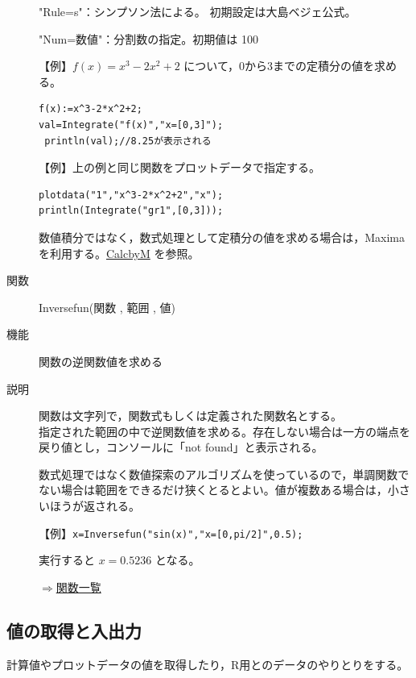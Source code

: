 \documentclass[papersize,a4paper,12pt,uplatex]{jsarticle}
\begin{document}
\begin{description}
"Rule=s"：シンプソン法による。 初期設定は大島ベジェ公式。

"Num=数値"：分割数の指定。初期値は 100 

\vspace{\baselineskip}
【例】$f(x)=x^3-2x^2+2$ について，0から3までの定積分の値を求める。
\begin{verbatim}
f(x):=x^3-2*x^2+2;
val=Integrate("f(x)","x=[0,3]");
 println(val);//8.25が表示される
\end{verbatim}

\vspace{\baselineskip}
【例】上の例と同じ関数をプロットデータで指定する。
\begin{verbatim}
plotdata("1","x^3-2*x^2+2","x");
println(Integrate("gr1",[0,3]));
\end{verbatim}

数値積分ではなく，数式処理として定積分の値を求める場合は，Maxima を利用する。\hyperlink{calcbyM}{CalcbyM}
を参照。

\vspace{\baselineskip}
\hypertarget{inversefun}{}
\item[関数]Inversefun(関数 , 範囲 , 値)
\item[機能]関数の逆関数値を求める
\item[説明]関数は文字列で，関数式もしくは定義された関数名とする。\\
指定された範囲の中で逆関数値を求める。存在しない場合は一方の端点を戻り値とし，コンソールに「not found」と表示される。

数式処理ではなく数値探索のアルゴリズムを使っているので，単調関数でない場合は範囲をできるだけ狭くとるとよい。値が複数ある場合は，小さいほうが返される。


\vspace{\baselineskip}
【例】\verb|x=Inversefun("sin(x)","x=[0,pi/2]",0.5);|

実行すると $x=0.5236$ となる。
\begin{flushright}\hyperlink{functionlist}{$\Rightarrow$関数一覧}\end{flushright}

\end{description}

\subsection{値の取得と入出力}

計算値やプロットデータの値を取得したり，R用とのデータのやりとりをする。
\end{document}
